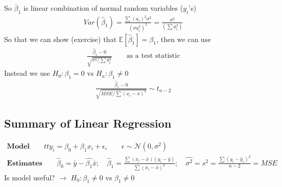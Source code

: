 So $\bar{\beta}_1$ is linear combination of normal random variables ($y_i$'s)
\begin{gather*}
	Var(\hat{\beta}_1) = \frac{\sum (a_i)^2 \sigma^2}{(\sigma a_i^2)^2} = \frac{\sigma^2}{(\sum a_i^2)}
\end{gather*}
So that we can show (exercise) that $\mathbb{E}[\hat{\beta}_1] = \beta_1$, then we can use
\begin{gather*}
	\frac{\hat{\beta}_1 - 0}{\sqrt{\sigma^2 / \sum a_i^2}} \qquad \text{as a test statistic}
\end{gather*}
Instead we use $H_0: \beta_1 = 0$ vs $H_a: \beta_1 \neq 0$
\begin{gather*}
	\frac{\hat{\beta}_1 - 0}{\sqrt{MSE / \sum (x_i - \bar{x})^2}}  \sim t_{n-2}
\end{gather*}
\subsection*{Summary of Linear Regression}
\begin{gather*}
\textbf{Model} \qquad tty_i = \beta_0 + \beta_1 x_i + \epsilon_i \qquad \epsilon \sim \mathcal{N}(0, \sigma^2)\\
\textbf{Estimates} \qquad \hat{\beta}_0 = \bar{y} - \hat{\beta_1}\bar{x}; \quad \hat{\beta}_1 = \frac{\sum (x_i - \bar{x}) (y_i - \bar{y})}{\sum (x_i - \bar{x})^2}; \quad \hat{\sigma^2} = s^2 = \frac{\sum (y_i - \hat{y}_i)^2}{n-2} = MSE
\end{gather*}
Is model useful? $\longrightarrow$ $H_0: \beta_1 \neq 0$ vs $\beta_1 \neq 0$